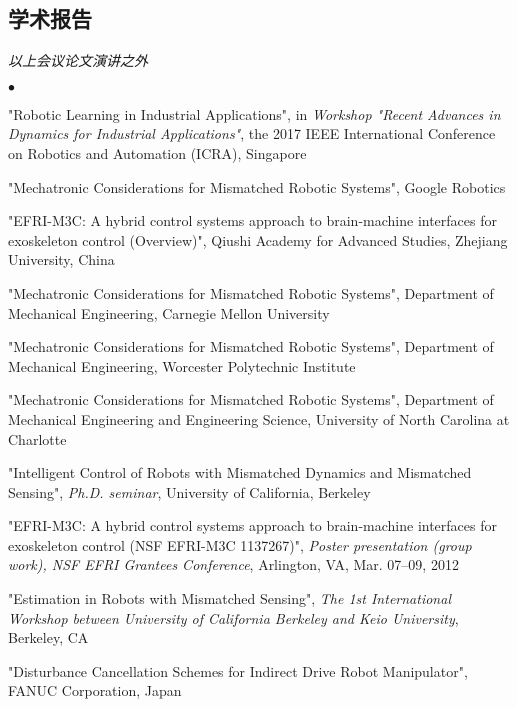 \documentclass[UTF8,nofonts]{res}
\begin{document}
\begin{resume}
\section{学术报告}
{\it 以上会议论文演讲之外}
\begin{list}{$\bullet$}{\setlength\leftmargin{0in}\setlength\topsep{0in}}
\item {} "Robotic Learning in Industrial Applications", in \emph{Workshop "Recent Advances in Dynamics for Industrial Applications"}, the 2017 IEEE International Conference on Robotics and Automation (ICRA), Singapore
\item {} "Mechatronic Considerations for Mismatched Robotic Systems", Google Robotics
\item {} "EFRI-M3C: A hybrid control systems approach to brain-machine interfaces for exoskeleton control (Overview)", Qiushi Academy for Advanced Studies, Zhejiang University, China
\item {} "Mechatronic Considerations for Mismatched Robotic Systems", Department of Mechanical Engineering, Carnegie Mellon University
\item {} "Mechatronic Considerations for Mismatched Robotic Systems", Department of Mechanical Engineering, Worcester Polytechnic Institute
\item {} "Mechatronic Considerations for Mismatched Robotic Systems", Department of Mechanical Engineering and Engineering Science, University of North Carolina at Charlotte
\item {} "Intelligent Control of Robots with Mismatched Dynamics and Mismatched Sensing", \emph{Ph.D. seminar}, University of California, Berkeley
\item {} "EFRI-M3C: A hybrid control systems approach to brain-machine interfaces for exoskeleton control (NSF EFRI-M3C 1137267)", \emph{Poster presentation (group work), NSF EFRI Grantees Conference}, Arlington, VA, Mar. 07--09, 2012
\item {} "Estimation in Robots with Mismatched Sensing", \emph{The 1st International Workshop between University of California Berkeley and Keio University}, Berkeley, CA
\item {} "Disturbance Cancellation Schemes for Indirect Drive Robot Manipulator", FANUC Corporation, Japan
\end{list}


\end{resume}
\end{document}
